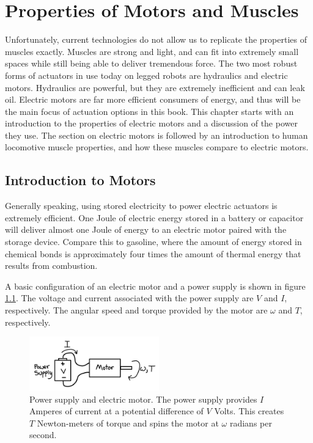 
\chapter{Properties of Motors and Muscles}
\label{sec:PropertiesOfMotorsAndMuscles}

Unfortunately, current technologies do not allow us to replicate the properties of muscles exactly. Muscles are strong and light, and can fit into extremely small spaces while still being able to deliver tremendous force. The two most robust forms of actuators in use today on legged robots are hydraulics and electric motors. Hydraulics are powerful, but they are extremely inefficient and can leak oil. Electric motors are far more efficient consumers of energy, and thus will be the main focus of actuation options in this book. This chapter starts with an introduction to the properties of electric motors and a discussion of the power they use. The section on electric motors is followed by an introduction to human locomotive muscle properties, and how these muscles compare to electric motors.

\section{Introduction to Motors} %
\label{IntroductionToMotors}

Generally speaking, using stored electricity to power electric actuators is extremely efficient. One Joule of electric energy stored in a battery or capacitor will deliver almost one Joule of energy to an electric motor paired with the storage device. Compare this to gasoline, where the amount of energy stored in chemical bonds is approximately four times the amount of thermal energy that results from combustion.

A basic configuration of an electric motor and a power supply is shown in figure \ref{fig:PowerSupplyAndMotor}. The voltage and current associated with the power supply are $V$ and $I$, respectively. The angular speed and torque provided by the motor are $\omega$ and $T$, respectively.

\begin{figure}[h]		%
\begin{centering}
\includegraphics[width=0.5\textwidth]{Figures/PowerSupplyAndMotor}\par
\end{centering}
\caption[Diagram: Power Supply and Electric Motor]{Power supply and electric motor. The power supply provides $I$ Amperes of current at a potential difference of $V$ Volts. This creates $T$ Newton-meters of torque and spins the motor at $\omega$ radians per second.}
\label{fig:PowerSupplyAndMotor}
\end{figure}
%

